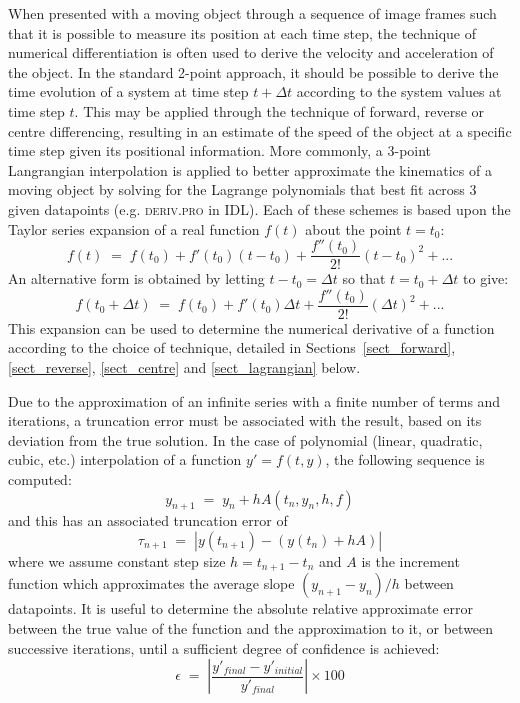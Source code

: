 \documentclass[namedreferences]{SolarPhysics}
\begin{document}
\begin{article}
When presented with a moving object through a sequence of image frames such that it is possible to measure its position at each time step, the technique of numerical differentiation is often used to derive the velocity and acceleration of the object. In the standard 2-point approach, it should be possible to derive the time evolution of a system at time step $t+\Delta t$ according to the system values at time step $t$. This may be applied through the technique of forward, reverse or centre differencing, resulting in an estimate of the speed of the object at a specific time step given its positional information. More commonly, a 3-point Langrangian interpolation is applied to better approximate the kinematics of a moving object by solving for the Lagrange polynomials that best fit across 3 given datapoints (e.g. \textsc{deriv.pro} in IDL). Each of these schemes is based upon the Taylor series expansion of a real function $f(t)$ about the point $t=t_0$:
\begin{equation}
\label{taylor1}
f(t) \; = \; f(t_0) + f'(t_0)(t-t_0) +  \frac{f''(t_0)}{2!}(t-t_0)^{2}   + ...
\end{equation}
An alternative form is obtained by letting $t-t_0=\Delta t$ so that $t=t_0+\Delta t$ to give:
\begin{equation}
\label{taylor2}
f(t_0+\Delta t) \; = \; f(t_0)+f'(t_0)\Delta t +  \frac{f''(t_0)}{2!}(\Delta t)^{2}  + ...
\end{equation}
This expansion can be used to determine the numerical derivative of a function according to the choice of technique, detailed in Sections~\ref{sect_forward}, \ref{sect_reverse}, \ref{sect_centre} and \ref{sect_lagrangian} below.

Due to the approximation of an infinite series with a finite number of terms and iterations, a truncation error must be associated with the result, based on its deviation from the true solution. In the case of polynomial (linear, quadratic, cubic, etc.) interpolation of a function $y'=f(t,y)$, the following sequence is computed:
\begin{equation}
y_{n+1} \; = \; y_{n} + h A\left(t_{n},y_{n},h,f\right)
\end{equation}
and this has an associated truncation error of
\begin{equation}
\tau_{n+1} \; = \; |y\left(t_{n+1}\right)-\left(y\left(t_{n}\right)+hA\right)|
\end{equation}
where we assume constant step size $h=t_{n+1}-t_{n}$ and $A$ is the increment function which approximates the average slope $\left(y_{n+1}-y_n\right)/h$ between datapoints. It is useful to determine the absolute relative approximate error between the true value of the function and the approximation to it, or between successive iterations, until a sufficient degree of confidence is achieved:
\begin{equation}
\epsilon \; = \; \left| \frac{y'_{final} - y'_{initial}}{y'_{final}}\right| \times 100
\end{equation}




\end{article}
\end{document}
